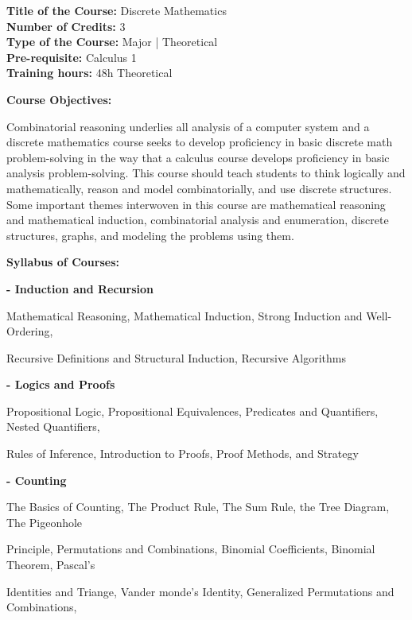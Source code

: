 \documentclass[12pt,a4paper]{article}
\begin{document}
\newpage
\textbf{Title of the Course:} Discrete Mathematics\\
\textbf{Number of Credits:} 3\\
\textbf{Type of the Course:} Major | Theoretical\\
\textbf{Pre-requisite:} Calculus 1\\
\textbf{Training hours:} 48h Theoretical\par\vspace{4pt}
\textbf{Course Objectives:}\par\vspace{2pt}
Combinatorial reasoning underlies all analysis of a computer system and a discrete mathematics
course seeks to develop proficiency in basic discrete math problem-solving in the way that a
calculus course develops proficiency in basic analysis problem-solving. This course should teach
students to think logically and mathematically, reason and model combinatorially, and use discrete
structures. Some important themes interwoven in this course are mathematical reasoning and
mathematical induction, combinatorial analysis and enumeration, discrete structures, graphs, and
modeling the problems using them.\par\vspace{4pt}
\textbf{Syllabus of Courses:}\par\vspace{2pt}
\vspace{2pt}\textbf{- Induction and Recursion}\par
Mathematical Reasoning, Mathematical Induction, Strong Induction and Well-Ordering,\par
Recursive Definitions and Structural Induction, Recursive Algorithms\par
\vspace{2pt}\textbf{- Logics and Proofs}\par
Propositional Logic, Propositional Equivalences, Predicates and Quantifiers, Nested Quantifiers,\par
Rules of Inference, Introduction to Proofs, Proof Methods, and Strategy\par
\vspace{2pt}\textbf{- Counting}\par
The Basics of Counting, The Product Rule, The Sum Rule, the Tree Diagram, The Pigeonhole\par
Principle, Permutations and Combinations, Binomial Coefficients, Binomial Theorem, Pascal’s\par
Identities and Triange, Vander monde's Identity, Generalized Permutations and Combinations,\par
\end{document}
